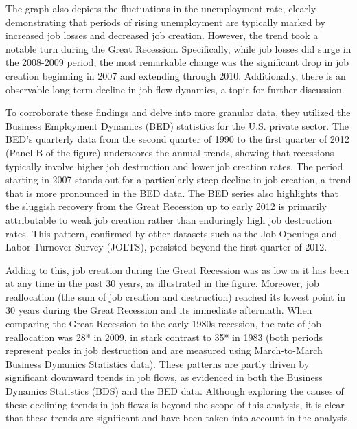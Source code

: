 \documentclass[12pt]{article}
\begin{document}
The graph also depicts the fluctuations in the unemployment rate, clearly demonstrating that periods of rising
unemployment are typically marked by increased job losses and decreased job creation. However, the trend took a notable
turn during the Great Recession. Specifically, while job losses did surge in the 2008-2009 period, the most remarkable
change was the significant drop in job creation beginning in 2007 and extending through 2010. Additionally, there is an
observable long-term decline in job flow dynamics, a topic for further discussion. 

To corroborate these findings and delve into more granular data, they utilized the Business Employment Dynamics (BED)
statistics for the U.S. private sector. The BED's quarterly data from the second quarter of 1990 to the first quarter of
2012 (Panel B of the figure) underscores the annual trends, showing that recessions typically involve higher job
destruction and lower job creation rates. The period starting in 2007 stands out for a particularly steep decline in job
creation, a trend that is more pronounced in the BED data. The BED series also highlights that the sluggish recovery
from the Great Recession up to early 2012 is primarily attributable to weak job creation rather than enduringly high job
destruction rates. This pattern, confirmed by other datasets such as the Job Openings and Labor Turnover Survey (JOLTS),
persisted beyond the first quarter of 2012. 

Adding to this, job creation during the Great Recession was as low as it has been at any time in the past 30 years, as
illustrated in the figure. Moreover, job reallocation (the sum of job creation and destruction) reached its lowest point
in 30 years during the Great Recession and its immediate aftermath. When comparing the Great Recession to the early
1980s recession, the rate of job reallocation was 28* in 2009, in stark contrast to 35* in 1983 (both periods represent
peaks in job destruction and are measured using March-to-March Business Dynamics Statistics data). These patterns are
partly driven by significant downward trends in job flows, as evidenced in both the Business Dynamics Statistics (BDS)
and the BED data. Although exploring the causes of these declining trends in job flows is beyond the scope of this
analysis, it is clear that these trends are significant and have been taken into account in the analysis. 
\end{document}
